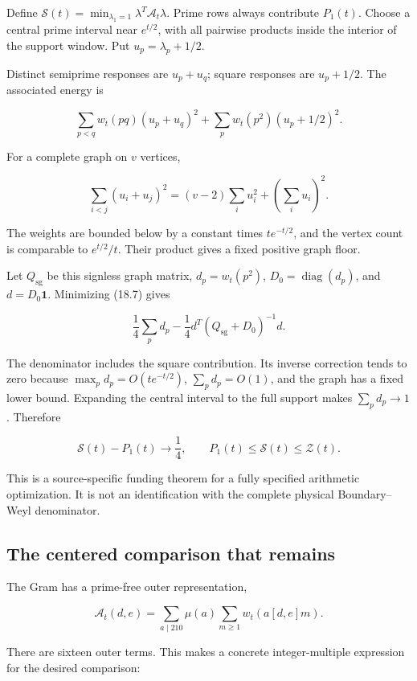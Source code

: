 \documentclass[
  10pt,
  a4paper,
  10pt,
  oneside,
  openany]{book}
\begin{document}
Define \(\mathcal S(t)=\min_{\lambda_1=1}\lambda^T\mathcal A_t\lambda\).
Prime rows always contribute \(P_1(t)\). Choose a central prime interval
near \(e^{t/2}\), with all pairwise products inside the interior of the
support window. Put \(u_p=\lambda_p+1/2\).

Distinct semiprime responses are \(u_p+u_q\); square responses are
\(u_p+1/2\). The associated energy is

\[
\sum_{p<q}w_t(pq)(u_p+u_q)^2
+\sum_pw_t(p^2)(u_p+1/2)^2.
\tag{18.7}\label{eq:18.7}
\]

For a complete graph on \(v\) vertices,

\[
\sum_{i<j}(u_i+u_j)^2
=(v-2)\sum_i u_i^2+\left(\sum_i u_i\right)^2.
\tag{18.8}\label{eq:18.8}
\]

The weights are bounded below by a constant times \(te^{-t/2}\), and the
vertex count is comparable to \(e^{t/2}/t\). Their product gives a fixed
positive graph floor.

Let \(Q_{\mathrm{sg}}\) be this signless graph matrix, \(d_p=w_t(p^2)\),
\(D_0=\operatorname{diag}(d_p)\), and \(d=D_0\mathbf1\). Minimizing
(18.7) gives

\[
\frac14\sum_pd_p
-\frac14d^T(Q_{\mathrm{sg}}+D_0)^{-1}d.
\tag{18.9}\label{eq:18.9}
\]

The denominator includes the square contribution. Its inverse correction
tends to zero because \(\max_pd_p=O(te^{-t/2})\), \(\sum_pd_p=O(1)\),
and the graph has a fixed lower bound. Expanding the central interval to
the full support makes \(\sum_pd_p\to1\). Therefore

\[
\mathcal S(t)-P_1(t)\longrightarrow\frac14,
\qquad
P_1(t)\le\mathcal S(t)\le\mathcal Z(t).
\tag{18.10}\label{eq:18.10}
\]

This is a source-specific funding theorem for a fully specified
arithmetic optimization. It is not an identification with the complete
physical Boundary--Weyl denominator.

\subsection{The centered comparison that
remains}\label{the-centered-comparison-that-remains}

The Gram has a prime-free outer representation,

\[
\mathcal A_t(d,e)
=\sum_{a\mid210}\mu(a)\sum_{m\ge1}w_t(a[d,e]m).
\tag{18.11}\label{eq:18.11}
\]

There are sixteen outer terms. This makes a concrete integer-multiple
expression for the desired comparison:
\end{document}
